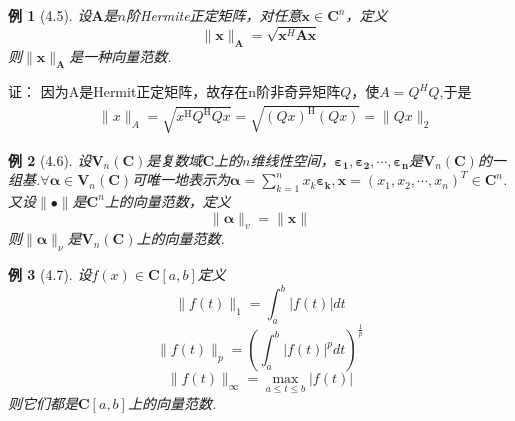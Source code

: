 \documentclass{sintefbeamer}[dark]
\newtheorem*{例}{例}
\begin{document}
\begin{frame}
	\begin{例}[4.5]
		设$\bm{A}$是$n$阶Hermite正定矩阵，对任意$\bm{x}\in\mathbf{C}^{n}$，定义
		$$
		\|\bm{x}\|_{\bm{A}}=\sqrt{\bm{x}^{H}\bm{A}\bm{x}}
		$$
		\linebreak
		则$\|\bm{x}\|_{\bm{A}}$是一种向量范数.
		\end{例}
	\pause
	证： 因为A是Hermit正定矩阵，故存在n阶非奇异矩阵$Q$，使$A=Q^{H}Q$,于是
	\begin{equation*}
	    \begin{aligned}
		&\parallel x\parallel_A=\sqrt{x^{\mathrm{H}}Q^{\mathrm{H}}Qx}=\sqrt{(Qx)^{\mathrm{H}}(Qx)}=\parallel Qx\parallel_2
		\end{aligned}
	\end{equation*}
	\end{frame}
		
	\begin{frame}
	\begin{例}[4.6]
		设$\bm{V}_{n}(\mathbf{C})$是复数域$\mathbf{C}$上的$n$维线性空间，$\bm{\varepsilon _{1}},\bm{\varepsilon _{2}},\cdots,\bm{\varepsilon _{n}}$是$\bm{V}_{n}(\mathbf{C})$的一组基.$\forall\bm{\alpha} \in\bm{V}_{n}(\mathbf{C})$可唯一地表示为$\bm{\alpha} =\sum_{k=1}^{n} x_{k}\bm{\varepsilon _{k}},\bm{x}=(x_{1}, x_{2},\cdots,x_{n})^{T}\in\mathbf{C}^{n}$.又设$\|\bullet\|$是$\mathbf{C}^{n}$上的向量范数，定义
		$$
		\|\bm{\alpha}\|_{v}=\|\bm{x}\|
		$$
		\linebreak
		则$\|\bm{\alpha}\|_{\nu}$是$\bm{V}_{n}(\mathbf{C})$上的向量范数.
		\end{例}
\end{frame}

\begin{frame}
	\begin{例}[4.7]
		设$f(x)\in\mathbf{C}[a,b]$定义
		$$
		\|f(t)\|_{1}=\int_{a}^{b}|f(t)|dt
		$$
		$$
		\|f(t)\|_{p}=(\int_{a}^{b}|f(t)|^{p}dt)^{\frac{1}{p} }
		$$
		$$
		\|f(t)\|_{\infty}=\max_{a\le t\le b}|f(t)| 
		$$
		\linebreak
		则它们都是$\mathbf{C}[a,b]$上的向量范数.
		\end{例}
	\end{frame}
		
\end{document}

